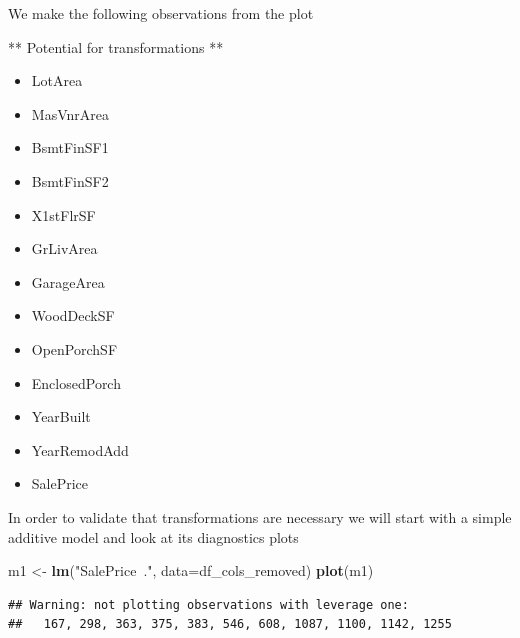 \documentclass[
]{article}
\newenvironment{Shaded}{\begin{snugshade}}{\end{snugshade}}
\newcommand{\DataTypeTok}[1]{\textcolor[rgb]{0.13,0.29,0.53}{#1}}
\newcommand{\KeywordTok}[1]{\textcolor[rgb]{0.13,0.29,0.53}{\textbf{#1}}}
\newcommand{\NormalTok}[1]{#1}
\newcommand{\StringTok}[1]{\textcolor[rgb]{0.31,0.60,0.02}{#1}}
\providecommand{\tightlist}{%
  \setlength{\itemsep}{0pt}\setlength{\parskip}{0pt}}
\begin{document}
We make the following observations from the plot

** Potential for transformations **

\begin{itemize}
\tightlist
\item
  LotArea
\item
  MasVnrArea
\item
  BsmtFinSF1
\item
  BsmtFinSF2
\item
  X1stFlrSF
\item
  GrLivArea
\item
  GarageArea
\item
  WoodDeckSF
\item
  OpenPorchSF
\item
  EnclosedPorch
\item
  YearBuilt
\item
  YearRemodAdd
\item
  SalePrice
\end{itemize}

In order to validate that transformations are necessary we will start with a simple additive model and look at its diagnostics plots

\begin{Shaded}
\begin{Highlighting}[]
\NormalTok{m1 <-}\StringTok{ }\KeywordTok{lm}\NormalTok{(}\StringTok{"SalePrice~."}\NormalTok{, }\DataTypeTok{data=}\NormalTok{df_cols_removed)}
\KeywordTok{plot}\NormalTok{(m1)}
\end{Highlighting}
\end{Shaded}

\begin{verbatim}
## Warning: not plotting observations with leverage one:
##   167, 298, 363, 375, 383, 546, 608, 1087, 1100, 1142, 1255
\end{verbatim}
\end{document}
